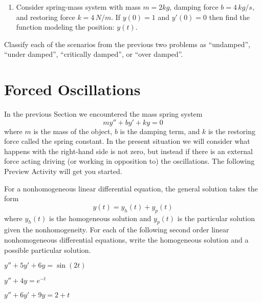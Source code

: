 \begin{problem}
\begin{enumerate}
    \item Consider spring-mass system with mass $m=2kg$, damping force $b=4\, kg/s$, and
        restoring force $k=4\,N/m$.  If $y(0)=1$ and $y'(0)=0$ then find the function
        modeling the position: $y(t)$. 
        \\
\end{enumerate}
\end{problem}


\begin{problem}
    Classify each of the scenarios from the previous two problems as ``undamped'', ``under
    damped'', ``critically damped'', or ``over damped''.
\end{problem}


\section{Forced Oscillations}
In the previous Section we encountered the mass spring system 
\[ my'' + by' + ky = 0 \]
where $m$ is the mass of the object, $b$ is the damping term, and $k$ is the restoring
force called the spring constant.  In the present situation we will consider what happens
with the right-hand side is not zero, but instead if there is an external force acting
driving (or working in opposition to) the oscillations.  The following Preview Activity
will get you started.

% 
\begin{problem}
    For a nonhomogeneous linear differential equation, the general solution takes the form
    \[ y(t) = y_h(t) + y_p(t) \]
    where $y_h(t)$ is the homogeneous solution and $y_p(t)$ is the particular solution
    given the nonhomogeneity.  For each of the following second
    order linear nonhomogeneous differential equations, write the homogeneous solution
    and a possible particular solution.
    \ba
        \item $y''+5y'+6y=\sin(2t)$
        \item $y''+4y=e^{-t}$
        \item $y''+6y'+9y=2+t$
    \ea
\end{problem}

